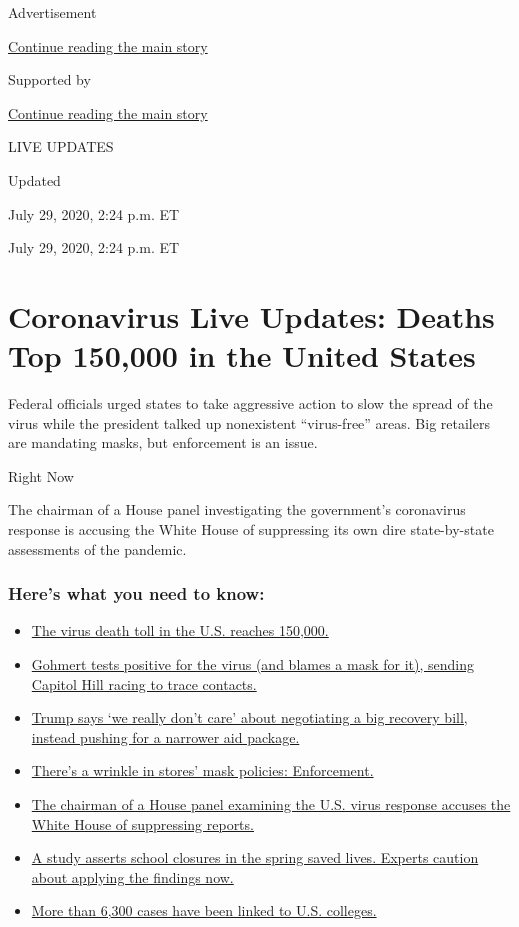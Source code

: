 Advertisement

\protect\hyperlink{after-top}{Continue reading the main story}

Supported by

\protect\hyperlink{after-sponsor}{Continue reading the main story}

LIVE UPDATES

Updated~

July 29, 2020, 2:24 p.m. ET

July 29, 2020, 2:24 p.m. ET

\hypertarget{coronavirus-live-updates-deaths-top-150000-in-the-united-states}{%
\section{Coronavirus Live Updates: Deaths Top 150,000 in the United
States}\label{coronavirus-live-updates-deaths-top-150000-in-the-united-states}}

Federal officials urged states to take aggressive action to slow the
spread of the virus while the president talked up nonexistent
``virus-free'' areas. Big retailers are mandating masks, but enforcement
is an issue.

Right Now

The chairman of a House panel investigating the government's coronavirus
response is accusing the White House of suppressing its own dire
state-by-state assessments of the pandemic.

\hypertarget{heres-what-you-need-to-know}{%
\subsubsection{Here's what you need to
know:}\label{heres-what-you-need-to-know}}

\begin{itemize}
\tightlist
\item
  \protect\hyperlink{link-1fc03c4a}{The virus death toll in the U.S.
  reaches 150,000.}
\item
  \protect\hyperlink{link-6644b9da}{Gohmert tests positive for the virus
  (and blames a mask for it), sending Capitol Hill racing to trace
  contacts.}
\item
  \protect\hyperlink{link-73760ee2}{Trump says `we really don't care'
  about negotiating a big recovery bill, instead pushing for a narrower
  aid package.}
\item
  \protect\hyperlink{link-531300e7}{There's a wrinkle in stores' mask
  policies: Enforcement.}
\item
  \protect\hyperlink{link-43ec24d5}{The chairman of a House panel
  examining the U.S. virus response accuses the White House of
  suppressing reports.}
\item
  \protect\hyperlink{link-69d86eaf}{A study asserts school closures in
  the spring saved lives. Experts caution about applying the findings
  now.}
\item
  \protect\hyperlink{link-4a99ca45}{More than 6,300 cases have been
  linked to U.S. colleges.}
\end{itemize}

